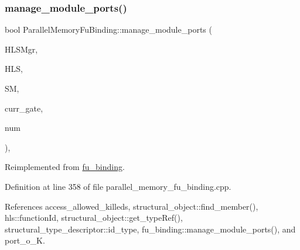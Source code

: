 \subsubsection{\texorpdfstring{manage\+\_\+module\+\_\+ports()}{manage\_module\_ports()}}
{\footnotesize\ttfamily bool Parallel\+Memory\+Fu\+Binding\+::manage\+\_\+module\+\_\+ports (\begin{DoxyParamCaption}\item[{const \hyperlink{hls__manager_8hpp_acd3842b8589fe52c08fc0b2fcc813bfe}{H\+L\+S\+\_\+manager\+Ref}}]{H\+L\+S\+Mgr,  }\item[{const \hyperlink{hls_8hpp_a75d0c73923d0ddfa28c4843a802c73a7}{hls\+Ref}}]{H\+LS,  }\item[{const \hyperlink{structural__manager_8hpp_ab3136f0e785d8535f8d252a7b53db5b5}{structural\+\_\+manager\+Ref}}]{SM,  }\item[{const \hyperlink{structural__objects_8hpp_a8ea5f8cc50ab8f4c31e2751074ff60b2}{structural\+\_\+object\+Ref}}]{curr\+\_\+gate,  }\item[{unsigned int}]{num }\end{DoxyParamCaption})\hspace{0.3cm}{\ttfamily [protected]}, {\ttfamily [virtual]}}



Reimplemented from \hyperlink{classfu__binding_a22ec0ba3bb337532e0fca26e2625085e}{fu\+\_\+binding}.



Definition at line 358 of file parallel\+\_\+memory\+\_\+fu\+\_\+binding.\+cpp.



References access\+\_\+allowed\+\_\+killeds, structural\+\_\+object\+::find\+\_\+member(), hls\+::function\+Id, structural\+\_\+object\+::get\+\_\+type\+Ref(), structural\+\_\+type\+\_\+descriptor\+::id\+\_\+type, fu\+\_\+binding\+::manage\+\_\+module\+\_\+ports(), and port\+\_\+o\+\_\+K.

